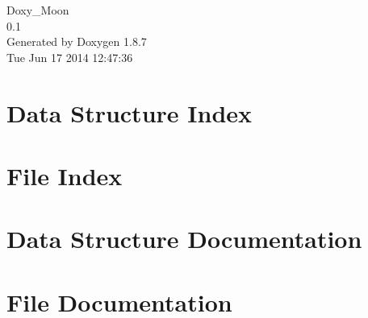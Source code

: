 \documentclass[twoside]{book}
\newcommand{\+}{\discretionary{\mbox{\scriptsize$\hookleftarrow$}}{}{}}
\newcommand{\clearemptydoublepage}{%
  \newpage{\pagestyle{empty}\cleardoublepage}%
}
\begin{document}
\hypersetup{pageanchor=false,
             bookmarks=true,
             bookmarksnumbered=true,
             pdfencoding=unicode
            }
\begin{titlepage}
\vspace*{7cm}
\begin{center}%
{\Large Doxy\+\_\+\+Moon \\[1ex]\large 0.\+1 }\\
\vspace*{1cm}
{\large Generated by Doxygen 1.8.7}\\
\vspace*{0.5cm}
{\small Tue Jun 17 2014 12:47:36}\\
\end{center}
\end{titlepage}
\clearemptydoublepage
\tableofcontents
\clearemptydoublepage
{}
\hypersetup{pageanchor=true}

\chapter{Data Structure Index}

\chapter{File Index}

\chapter{Data Structure Documentation}











\chapter{File Documentation}











































\newpage
{}
{}
\printindex
\end{document}
